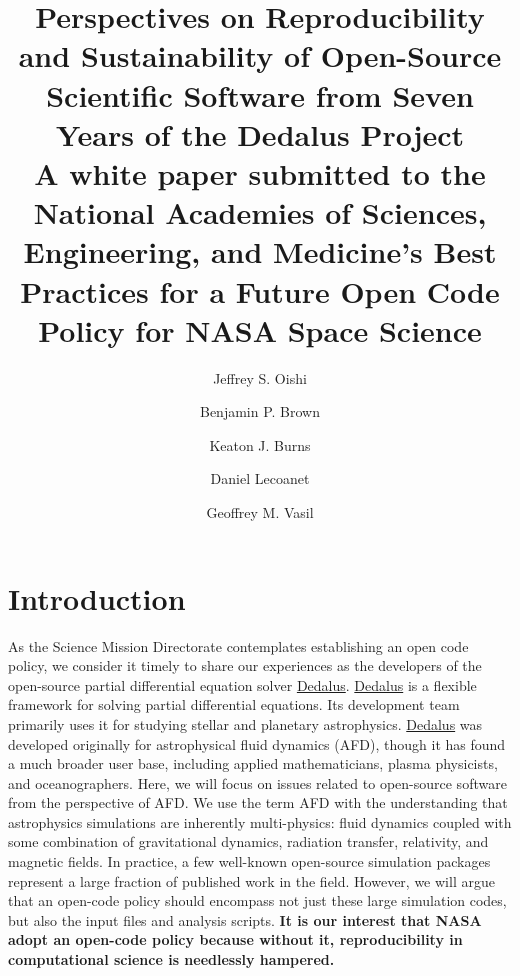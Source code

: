 \documentclass[12pt, titlepage]{aastex62}
\newcommand{\dedalus}{\href{http://dedalus-project.org}{Dedalus}}
\begin{document}
\title{Perspectives on Reproducibility and Sustainability of Open-Source Scientific Software from Seven Years of the Dedalus Project\\{\small A white paper submitted to the National Academies of Sciences, Engineering, and Medicine's Best Practices for a Future Open Code Policy for NASA Space Science}}
\author{Jeffrey S. Oishi}


\author{Benjamin P. Brown}
\author{Keaton J. Burns}
\author{Daniel Lecoanet}
\author{Geoffrey M. Vasil}

\section{Introduction}
\label{sec:intro}
As the Science Mission Directorate contemplates establishing an open code policy, we consider it timely to share our experiences as the developers of the open-source partial differential equation solver \dedalus{}. \dedalus{} is a flexible framework for solving partial differential equations. Its development team primarily uses it for studying stellar and planetary astrophysics.  \dedalus{} was developed originally for astrophysical fluid dynamics (AFD), though it has found a much broader user base, including applied mathematicians, plasma physicists, and oceanographers. Here, we will focus on issues related to open-source software from the perspective of AFD. We use the term AFD with the understanding that astrophysics simulations are inherently multi-physics: fluid dynamics coupled with some combination of gravitational dynamics, radiation transfer, relativity, and magnetic fields. In practice, a few well-known open-source simulation packages represent a large fraction of published work in the field. However, we will argue that an open-code policy should encompass not just these large simulation codes, but also the input files and analysis scripts. \textbf{It is our interest that NASA adopt an open-code policy because without it, reproducibility in computational science is needlessly hampered.} 
\end{document}
